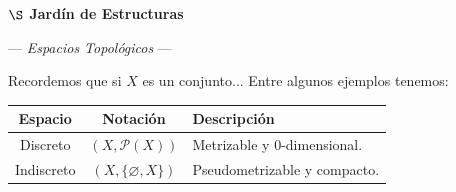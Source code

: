 


\begin{center}
    {\large \textbf{ $\S$ Jardín de Estructuras}} {$~$\small\FourClowerSolid }
\end{center}
\vspace{0.14cm}
\begin{center}
    {--- \large\textit{ Espacios Topológicos }---}
\end{center}
\vspace{0.15cm}

{\fontsize{7}{5} Recordemos que si $X$ es un conjunto... 
Entre algunos ejemplos tenemos:}
\begin{center}
\footnotesize 
\setlength{\tabcolsep}{4pt}
\begin{tabular}{@{} c c m{2.55cm} @{}}
\hline 
\textbf{Espacio} & \textbf{Notación} & \textbf{Descripción}\\
\hline 
Discreto & $(X, \mathscr{P}(X))$ & \raggedright\arraybackslash\scriptsize Metrizable y $0$-dimensional. \\[4pt]
Indiscreto & $(X, \{\varnothing, X\})$ & \raggedright\arraybackslash\scriptsize Pseudometrizable y compacto. \\
\hline
\end{tabular}
\end{center}

